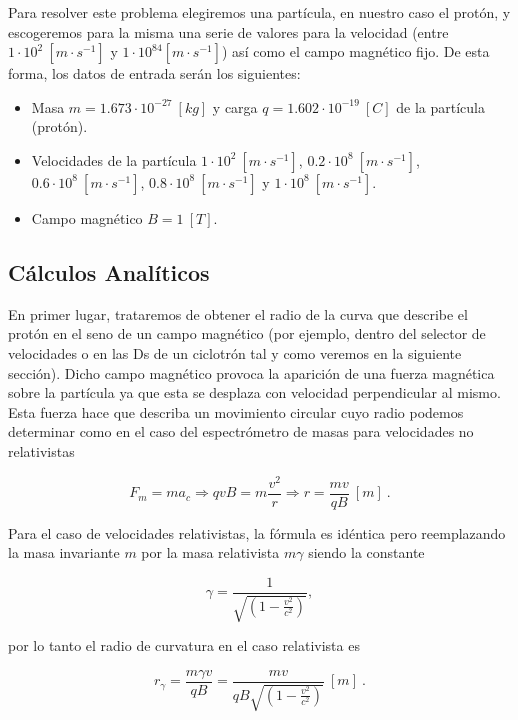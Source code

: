 \documentclass[journal]{IEEEtran}
\begin{document}
Para resolver este problema elegiremos una partícula, en nuestro caso el protón, y escogeremos para la misma una serie de valores para la velocidad (entre $1\cdot 10^2~[m\cdot s^{-1}]$ y $1\cdot 10^84[m\cdot s^{-1}]$) así como el campo magnético fijo. De esta forma, los datos de entrada serán los siguientes:

\begin{itemize}
    \item Masa $m = 1.673\cdot 10^{-27}~[kg]$ y carga $q = 1.602\cdot 10^{-19}~[C]$ de la partícula (protón).
    \item Velocidades de la partícula $1\cdot 10^2~[m\cdot s^{-1}]$, $0.2\cdot 10^8~[m\cdot s^{-1}]$, $0.6\cdot 10^8~[m\cdot s^{-1}]$, $0.8\cdot 10^8~[m\cdot s^{-1}]$ y $1\cdot 10^8~[m\cdot s^{-1}]$.
    \item Campo magnético $B = 1~[T]$.
\end{itemize}

\subsection{Cálculos Analíticos}

En primer lugar, trataremos de obtener el radio de la curva que describe el protón en el seno de un campo magnético (por ejemplo, dentro del selector de velocidades o en las Ds de un ciclotrón tal y como veremos en la siguiente sección). Dicho campo magnético provoca la aparición de una fuerza magnética sobre la partícula ya que esta se desplaza con velocidad perpendicular al mismo. Esta fuerza hace que describa un movimiento circular cuyo radio podemos determinar como en el caso del espectrómetro de masas para velocidades no relativistas

\begin{equation}
F_m = ma_c \Rightarrow qvB = m \displaystyle\frac{v^2}{r} \Rightarrow r = \displaystyle\frac{mv}{qB}~[m]~.
\end{equation}

Para el caso de velocidades relativistas, la fórmula es idéntica pero reemplazando la masa invariante $m$ por la masa relativista $m\gamma$ siendo la constante

\begin{equation}
\gamma = \displaystyle\frac{1}{\sqrt{(1-\displaystyle\frac{v^2}{c^2})}},
\end{equation}

por lo tanto el radio de curvatura en el caso relativista es

\begin{equation}
r_\gamma = \displaystyle\frac{m\gamma v}{qB} = \displaystyle\frac{mv}{qB\sqrt{(1-\displaystyle\frac{v^2}{c^2})}}~[m]~.
\end{equation}
\end{document}
